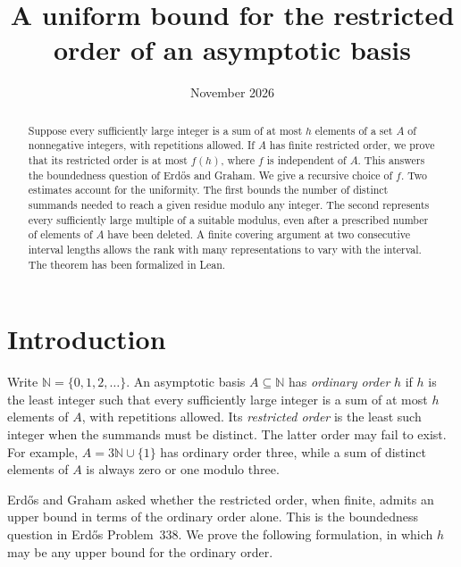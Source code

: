\documentclass[11pt,reqno]{amsart}
\theoremstyle{definition}
\theoremstyle{remark}
\begin{document}
\title[A uniform bound for restricted order]{A uniform bound for the restricted order of an asymptotic basis}
\author{}
\address{Excession}
\date{November 2026}

\begin{abstract}
Suppose every sufficiently large integer is a sum of at most \(h\) elements of a set \(A\) of nonnegative integers, with repetitions allowed. If \(A\) has finite restricted order, we prove that its restricted order is at most \(f(h)\), where \(f\) is independent of \(A\). This answers the boundedness question of Erd\H{o}s and Graham. We give a recursive choice of \(f\). Two estimates account for the uniformity. The first bounds the number of distinct summands needed to reach a given residue modulo any integer. The second represents every sufficiently large multiple of a suitable modulus, even after a prescribed number of elements of \(A\) have been deleted. A finite covering argument at two consecutive interval lengths allows the rank with many representations to vary with the interval. The theorem has been formalized in Lean.
\end{abstract}

\maketitle

\section{Introduction}

Write \(\mathbb N=\{0,1,2,\ldots\}\). An asymptotic basis \(A\subseteq\mathbb N\) has \emph{ordinary order} \(h\) if \(h\) is the least integer such that every sufficiently large integer is a sum of at most \(h\) elements of \(A\), with repetitions allowed. Its \emph{restricted order} is the least such integer when the summands must be distinct. The latter order may fail to exist. For example, \(A=3\mathbb N\cup\{1\}\) has ordinary order three, while a sum of distinct elements of \(A\) is always zero or one modulo three.

Erd\H{o}s and Graham \cite[p.~206, question 3(ii)]{EG80} asked whether the restricted order, when finite, admits an upper bound in terms of the ordinary order alone. This is the boundedness question in Erd\H{o}s Problem~338. We prove the following formulation, in which \(h\) may be any upper bound for the ordinary order.
\end{document}
